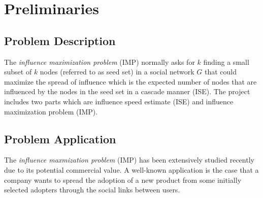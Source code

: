 \documentclass[conference,compsoc]{IEEEtran}
\begin{document}






%
\IEEEpeerreviewmaketitle



\section{Preliminaries}
\subsection{Problem Description}
The \textit{influence maximization problem} (IMP) normally asks for $k$ finding a
small subset of $k$ nodes (referred to as seed set) in a social network $G$ that
could maximize the spread of influence which is the expected number of nodes that are
influenced by the nodes in the seed set in a cascade manner (ISE). The project includes two parts which are influence speed estimate (ISE) and influence maximization problem (IMP).

\subsection{Problem Application}
The \textit{influence maxmization problem} (IMP) has been extensively studied recently due to its potential commercial value. A well-known application is the case that a company wants to spread the adoption of a new product from some initially selected adopters through the social links between users.
\end{document}
